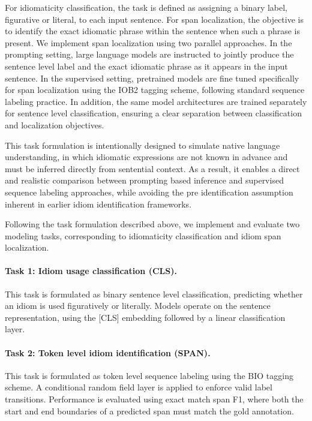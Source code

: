 \documentclass[11pt]{article}
\begin{document}
For idiomaticity classification, the task is defined as assigning a binary label, figurative or literal, to each input sentence. For span localization, the objective is to identify the exact idiomatic phrase within the sentence when such a phrase is present. We implement span localization using two parallel approaches. In the prompting setting, large language models are instructed to jointly produce the sentence level label and the exact idiomatic phrase as it appears in the input sentence. In the supervised setting, pretrained models are fine tuned specifically for span localization using the IOB2 tagging scheme, following standard sequence labeling practice. In addition, the same model architectures are trained separately for sentence level classification, ensuring a clear separation between classification and localization objectives.

This task formulation is intentionally designed to simulate native language understanding, in which idiomatic expressions are not known in advance and must be inferred directly from sentential context. As a result, it enables a direct and realistic comparison between prompting based inference and supervised sequence labeling approaches, while avoiding the pre identification assumption inherent in earlier idiom identification frameworks.


Following the task formulation described above, we implement and evaluate two modeling tasks, corresponding to idiomaticity classification and idiom span localization.

\paragraph{Task 1: Idiom usage classification (CLS).}
This task is formulated as binary sentence level classification, predicting whether an idiom is used figuratively or literally. Models operate on the sentence representation, using the [CLS] embedding followed by a linear classification layer.

\paragraph{Task 2: Token level idiom identification (SPAN).}
This task is formulated as token level sequence labeling using the BIO tagging scheme. A conditional random field layer is applied to enforce valid label transitions. Performance is evaluated using exact match span F1, where both the start and end boundaries of a predicted span must match the gold annotation.
\end{document}
